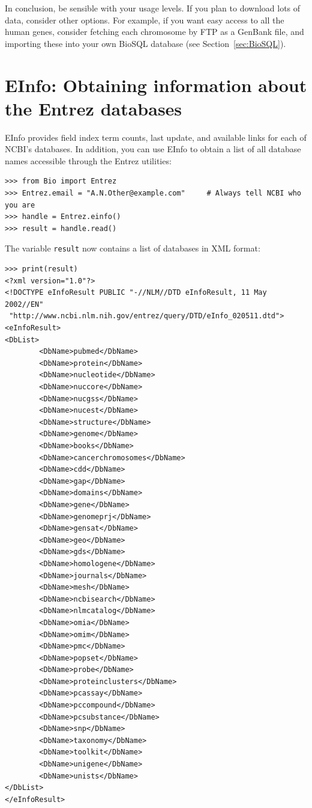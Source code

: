 \documentclass{report}
\begin{document}
In conclusion, be sensible with your usage levels.  If you plan to download lots of data, consider other options.  For example, if you want easy access to all the human genes, consider fetching each chromosome by FTP as a GenBank file, and importing these into your own BioSQL database (see Section~\ref{sec:BioSQL}).

\section{EInfo: Obtaining information about the Entrez databases}
\label{sec:entrez-einfo}
EInfo provides field index term counts, last update, and available links for each of NCBI's databases. In addition, you can use EInfo to obtain a list of all database names accessible through the Entrez utilities:
\begin{verbatim}
>>> from Bio import Entrez
>>> Entrez.email = "A.N.Other@example.com"     # Always tell NCBI who you are
>>> handle = Entrez.einfo()
>>> result = handle.read()
\end{verbatim}
The variable \verb+result+ now contains a list of databases in XML format:
\begin{verbatim}
>>> print(result)
<?xml version="1.0"?>
<!DOCTYPE eInfoResult PUBLIC "-//NLM//DTD eInfoResult, 11 May 2002//EN"
 "http://www.ncbi.nlm.nih.gov/entrez/query/DTD/eInfo_020511.dtd">
<eInfoResult>
<DbList>
        <DbName>pubmed</DbName>
        <DbName>protein</DbName>
        <DbName>nucleotide</DbName>
        <DbName>nuccore</DbName>
        <DbName>nucgss</DbName>
        <DbName>nucest</DbName>
        <DbName>structure</DbName>
        <DbName>genome</DbName>
        <DbName>books</DbName>
        <DbName>cancerchromosomes</DbName>
        <DbName>cdd</DbName>
        <DbName>gap</DbName>
        <DbName>domains</DbName>
        <DbName>gene</DbName>
        <DbName>genomeprj</DbName>
        <DbName>gensat</DbName>
        <DbName>geo</DbName>
        <DbName>gds</DbName>
        <DbName>homologene</DbName>
        <DbName>journals</DbName>
        <DbName>mesh</DbName>
        <DbName>ncbisearch</DbName>
        <DbName>nlmcatalog</DbName>
        <DbName>omia</DbName>
        <DbName>omim</DbName>
        <DbName>pmc</DbName>
        <DbName>popset</DbName>
        <DbName>probe</DbName>
        <DbName>proteinclusters</DbName>
        <DbName>pcassay</DbName>
        <DbName>pccompound</DbName>
        <DbName>pcsubstance</DbName>
        <DbName>snp</DbName>
        <DbName>taxonomy</DbName>
        <DbName>toolkit</DbName>
        <DbName>unigene</DbName>
        <DbName>unists</DbName>
</DbList>
</eInfoResult>
\end{verbatim}
\end{document}
